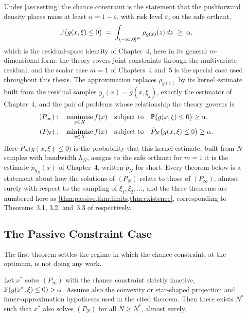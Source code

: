 Under \cref{ass:setting} the chance constraint is the statement that the
pushforward density places mass at least $\alpha = 1-\varepsilon$, with risk level $\varepsilon$, on the
safe orthant,
\begin{equation}
  \mathbb{P}\bigl(g(x,\xi) \leq 0\bigr)
  \;=\; \int_{(-\infty,0]^m} \rho_{g(x)}(z)\, dz \;\geq\; \alpha ,
  \label{eq:pushforward}
\end{equation}
which is the residual-space identity of
Chapter~4, here in its general $m$-dimensional form: the theory covers
joint constraints through the multivariate residual, and the scalar case
$m = 1$ of Chapters~4 and~5 is the special case used throughout this
thesis. The approximation replaces $\rho_{g(x)}$ by its kernel estimate
built from the residual samples $y_j(x) = g(x,\xi_j)$, exactly the
estimator of Chapter~4, and the pair of problems whose relationship the
theory governs is
\begin{align}
  (P_\infty):\quad
  &\operatorname*{minimize}_{x \in X} f(x)
  \quad\text{subject to}\quad
  \mathbb{P}\bigl(g(x,\xi) \leq 0\bigr) \geq \alpha ,
  \label{eq:pinf}\\
  (P_N):\quad
  &\operatorname*{minimize}_{x \in X} f(x)
  \quad\text{subject to}\quad
  \hat{P}_N\bigl(g(x,\xi) \leq 0\bigr) \geq \alpha .
  \label{eq:pn}
\end{align}
Here $\hat{P}_N\bigl(g(x,\xi)\le 0\bigr)$ is the probability that this
kernel estimate, built from $N$ samples with bandwidth $h_N$, assigns to
the safe orthant; for $m=1$ it is the estimate $\hat{p}_{h_N}(x)$ of
Chapter~4, written $\hat{p}_N$ for short.
Every theorem below is a statement about how the solutions of $(P_N)$
relate to those of $(P_\infty)$, almost surely with respect to the
sampling of $\xi_1, \xi_2, \dots$, and the three theorems are numbered
here as \cref{thm:passive,thm:limits,thm:existence}, corresponding to
Theorems~3.1, 3.2, and~3.3 of \citet{schuster2025} respectively.

\subsection{The Passive Constraint Case}
\label{sec:thm1}

The first theorem settles the regime in which the chance constraint, at
the optimum, is not doing any work.

\begin{theorem}
\label{thm:passive}
Let $x^*$ solve $(P_\infty)$ with the chance constraint strictly
inactive, $\mathbb{P}(g(x^*,\xi) \leq 0) > \alpha$. Assume also the
convexity or star-shaped projection and inner-approximation hypotheses
used in the cited theorem. Then there exists $N^*$
such that $x^*$ also solves $(P_N)$ for all $N \geq N^*$, almost surely.
\end{theorem}

